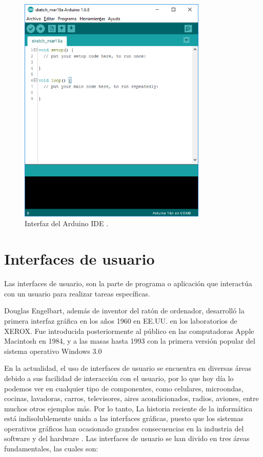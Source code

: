 \begin{figure}[H]
\centering
\includegraphics[width=0.8\textwidth]{./imagenes/teoria/ide.png} 
\caption{Interfaz del Arduino IDE \cite{Arduino2018}.}
\label{F:IDE}
\end{figure}



\section{Interfaces de usuario}

Las interfaces de usuario, son la parte de programa o aplicación que interactúa con un usuario para realizar tareas específicas.

Douglas Engelbart, además de inventor del ratón de ordenador, desarrolló la primera interfaz gráfica en los años 1960 en EE.UU. en los laboratorios de XEROX. Fue introducida posteriormente al público en las computadoras Apple Macintosh en 1984, y a las masas hasta 1993 con la primera versión popular del sistema operativo Windows 3.0

En la actualidad, el uso de interfaces de usuario se encuentra en diversas áreas debido a sus facilidad de interacción con el usuario, por lo que hoy día lo podemos ver en cualquier tipo de componentes, como celulares, microondas, cocinas, lavadoras, carros, televisores, aires acondicionados, radios, aviones, entre muchos otros ejemplos más. Por lo tanto, La historia reciente de la informática está indisolublemente unida a las interfaces gráficas, puesto que los sistemas operativos gráficos han ocasionado grandes consecuencias en la industria del software y del hardware \cite{Pavon2017}. Las interfaces de usuario se han divido en tres áreas fundamentales, las cuales son:

